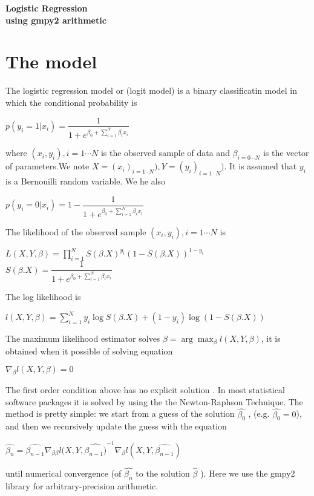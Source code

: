 \documentclass[12pt]{article}
\begin{document}
\begin{center}
\large\textbf {Logistic Regression \\ using gmpy2 arithmetic }
\end{center}

\section{The model}

The logistic regression model or (logit model) is a binary classificatin model in which the conditional probability is
\begin{center}
  $p(y_{i}=1|x_{i}) =  \dfrac{1}{1+e^{\beta_{0}+\sum_{i=1}^{N} \beta_{i}x_{i}}}$
\end{center}
where $(x_{i},y_{i}), i=1 \cdots N$ is the observed sample of data and $\beta_{i = 0 \cdots N}$ is the vector of parameters.We note $X=(x_{i})_{i=1 \cdot N}), Y=(y_{i})_{i=1 \cdot N})$.
It is assumed that $y_{i}$ is a Bernouilli random variable. We he also
\begin{center}
  $p(y_{i}=0|x_{i}) = 1 - \dfrac{1}{1+e^{\beta_{0}+\sum_{i=1}^{N} \beta_{i}x_{i}}}$
\end{center}
The likelihood of the observed sample $(x_{i},y_{i}), i=1 \cdots N$ is
\begin{center}
  $L(X,Y,\beta) = \prod_{i=1}^{N}S(\beta.X)^{y_{i}}(1 - S(\beta.X))^{1-y_{i}}$
  \\
  $S(\beta.X)= \dfrac{1}{1+e^{\beta_{0}+\sum_{i=1}^{N} \beta_{i}x_{i}}}$
\end{center}
The log likelihood is
\begin{center}
  $l(X,Y,\beta) = \sum_{i=1}^{N} y_{i}\log S(\beta.X) + (1-y_{i}) \log(1 - S(\beta.X))$
\end{center}
The maximum likelihood estimator solves $\widehat{\beta} = \arg \max_{\beta} l(X,Y, \beta)$, it is obtained when it possible of solving equation
\begin{center}
  $\nabla_{\beta}l(X,Y,\beta) = 0$
\end{center}
The first order condition above has no explicit solution .  In most statistical software packages it is solved by using the the Newton-Raphson Technique. The method is pretty simple: we start from a guess of the solution $\widehat{\beta_{0}}$ , (e.g. $\widehat{\beta_{0}}=0$), and then we recursively update the guess with the equation
\begin{center}
  $\widehat{\beta_{n}} = \widehat{\beta_{n-1}} \nabla_{\beta\beta}l(X,Y,\widehat{\beta_{n-1})}^{-1} \nabla_{\beta}l(X,Y,\widehat{\beta_{n-1}})$
\end{center}
until numerical convergence (of $\widehat{\beta_{n}}$ to the solution $\widehat{\beta}$ ). Here we use the gmpy2 library for arbitrary-precision arithmetic.
\end{document}

